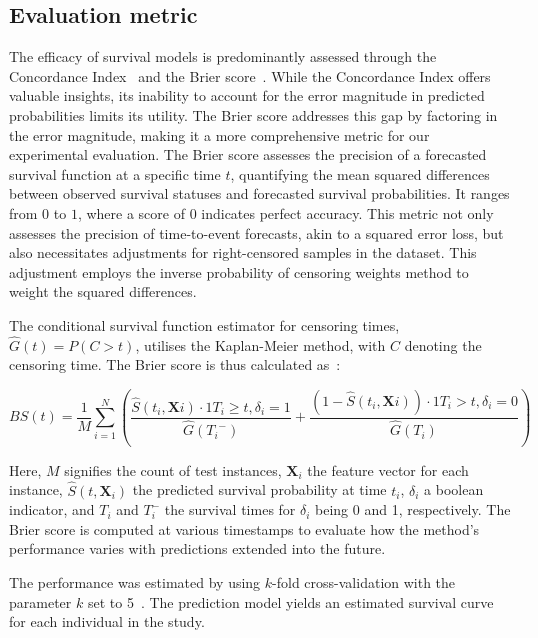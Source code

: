 \documentclass[3p,review,authoryear]{elsarticle}
\begin{document}
\subsection{Evaluation metric}

The efficacy of survival models is predominantly assessed through the Concordance Index~\citep{brentnall2018use} and the Brier score~\citep{gerds2006consistent}.
While the Concordance Index offers valuable insights, its inability to account for the error magnitude in predicted probabilities limits its utility.
The Brier score addresses this gap by factoring in the error magnitude, making it a more comprehensive metric for our experimental evaluation.
The Brier score assesses the precision of a forecasted survival function at a specific time $t$, quantifying the mean squared differences between observed survival statuses and forecasted survival probabilities.
It ranges from $0$ to $1$, where a score of $0$ indicates perfect accuracy.
This metric not only assesses the precision of time-to-event forecasts, akin to a squared error loss, but also necessitates adjustments for right-censored samples in the dataset.
This adjustment employs the inverse probability of censoring weights method to weight the squared differences.

The conditional survival function estimator for censoring times, $\hat{G}(t)=P(C>t)$, utilises the Kaplan-Meier method, with $C$ denoting the censoring time.
The Brier score is thus calculated as~\citep{trickbrier}:

\begin{equation}
BS(t) = \frac{1}{M}\sum\limits_{i=1}^N \left(\frac{\hat{S}(t_i,\mathbf{X}i)\cdot1{T_i\geq{t},\delta_i=1}}{\hat{G}({T_i}^-)}+\frac{(1-\hat{S}(t_i,\mathbf{X}i))\cdot1{T_i>t, \delta_i=0}}{\hat{G}(T_i)}\right)
\label{eq:bs}
\end{equation}

Here, $M$ signifies the count of test instances, $\mathbf{X}_i$ the feature vector for each instance, $\hat{S}(t, \mathbf{X}_i)$ the predicted survival probability at time $t_i$, $\delta_i$ a boolean indicator, and $T_i$ and $T_i^-$ the survival times for $\delta_i$ being 0 and 1, respectively. The Brier score is computed at various timestamps to evaluate how the method's performance varies with predictions extended into the future.

The performance was estimated by using $k$-fold cross-validation with the parameter $k$ set to 5~\citep{elstatl}.
The prediction model yields an estimated survival curve for each individual in the study.
\end{document}
